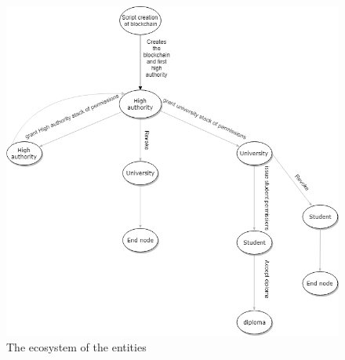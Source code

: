 \documentclass[conference]{IEEEtran}
\begin{document}
\begin{figure}[h]
\includegraphics[width=\linewidth]{flow.png}
  \caption{The ecosystem of the entities }
\end{figure}
\end{document}
